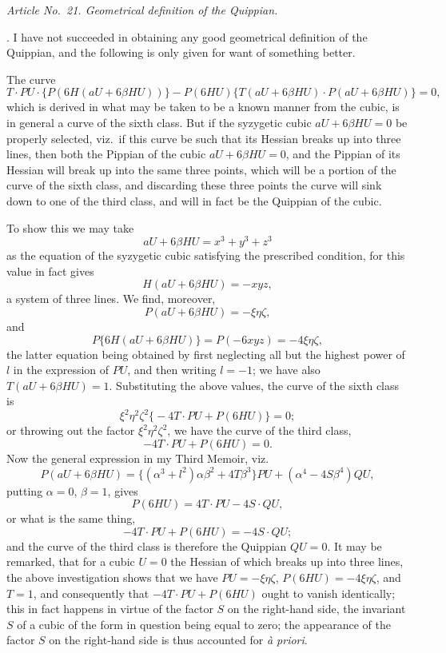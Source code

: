 \documentclass[11pt]{article}
\begin{document}
\medskip

\textit{Article No.~21. Geometrical definition of the Quippian.}

\medskip

. I have not succeeded in obtaining any good geometrical definition of the Quippian, and the following is only given for want of something better.

The curve
\[
T \cdot PU \cdot \bigl\{P(6 H(a U + 6 \beta H U))\bigr\} - P(6 H U)\bigl\{T(a U + 6 \beta H U)\cdot P(a U + 6 \beta H U)\bigr\} = 0,
\]
which is derived in what may be taken to be a known manner from the cubic, is in general a curve of the sixth class. But if the syzygetic cubic $a U + 6 \beta H U = 0$ be properly selected, viz.\ if this curve be such that its Hessian breaks up into three lines, then both the Pippian of the cubic $a U + 6 \beta H U = 0$, and the Pippian of its Hessian will break up into the same three points, which will be a portion of the curve of the sixth class, and discarding these three points the curve will sink down to one of the third class, and will in fact be the Quippian of the cubic.

To show this we may take
\[
a U + 6 \beta H U = x^3 + y^3 + z^3
\]
as the equation of the syzygetic cubic satisfying the prescribed condition, for this value in fact gives
\[
H(a U + 6 \beta H U) = -x y z,
\]
a system of three lines. We find, moreover,
\[
P(a U + 6 \beta H U) = -\xi\eta\zeta,
\]
and
\[
P\bigl\{6 H(a U + 6 \beta H U)\bigr\} = P(-6 x y z) = -4 \xi\eta\zeta,
\]
the latter equation being obtained by first neglecting all but the highest power of $l$ in the expression of $PU$, and then writing $l = -1$; we have also $T(a U + 6 \beta H U) = 1$. Substituting the above values, the curve of the sixth class is
\[
\xi^2 \eta^2 \zeta^2 \bigl\{-4 T \cdot PU + P(6 H U)\bigr\} = 0;
\]
or throwing out the factor $\xi^2 \eta^2 \zeta^2$, we have the curve of the third class,
\[
-4 T \cdot PU + P(6 H U) = 0.
\]
Now the general expression in my Third Memoir, viz.
\[
P(a U + 6 \beta H U) = \bigl\{(\alpha^3 + l^2)\alpha\beta^2 + 4 T \beta^3\bigr\} PU + (\alpha^4 - 4 S \beta^4) QU,
\]
putting $\alpha = 0$, $\beta = 1$, gives
\[
P(6 H U) = 4 T \cdot PU - 4 S \cdot QU,
\]
or what is the same thing,
\[
-4 T \cdot PU + P(6 H U) = -4 S \cdot QU;
\]
and the curve of the third class is therefore the Quippian $QU = 0$. It may be remarked, that for a cubic $U = 0$ the Hessian of which breaks up into three lines, the above investigation shows that we have $PU = -\xi\eta\zeta$, $P(6 H U) = -4 \xi\eta\zeta$, and $T = 1$, and consequently that $-4 T \cdot PU + P(6 H U)$ ought to vanish identically; this in fact happens in virtue of the factor $S$ on the right-hand side, the invariant $S$ of a cubic of the form in question being equal to zero; the appearance of the factor $S$ on the right-hand side is thus accounted for \textit{\`a priori}.
\end{document}
